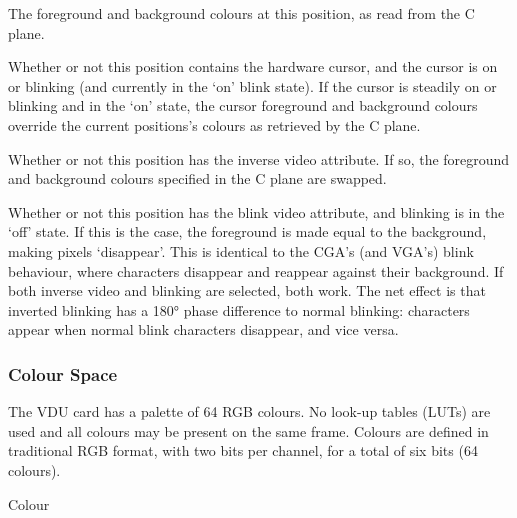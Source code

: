 \begin{itemize}
  \li The foreground and background colours at this position, as read from the
  C plane.

  \li Whether or not this position contains the hardware cursor, and
  the cursor is on or blinking (and currently in the ‘on’ blink state). If the
  cursor is steadily on or blinking and in the ‘on’ state, the cursor
  foreground and background colours override the current positions's colours as
  retrieved by the C plane.

  \li Whether or not this position has the inverse video attribute. If so, the
  foreground and background colours specified in the C plane are swapped.

  \li Whether or not this position has the blink video attribute, and blinking
  is in the ‘off’ state. If this is the case, the foreground is made equal to
  the background, making pixels ‘disappear’. This is identical to the CGA's
  (and VGA's) blink behaviour, where characters disappear and reappear against
  their background. If both inverse video and blinking are selected, both
  work. The net effect is that inverted blinking has a 180° phase difference to
  normal blinking: characters appear when normal blink characters disappear,
  and vice versa.
\end{itemize}

\subsubsection{Colour Space}

The VDU card has a palette of 64 RGB colours. No look-up tables (LUTs)
are used and all colours may be present on the same frame. Colours are
defined in traditional RGB format, with two bits per channel, for a
total of six bits (64 colours).

\begin{datastructure}[Bits]{Colour}
\end{datastructure}

\begin{nbitfield}{6}
\end{nbitfield}

